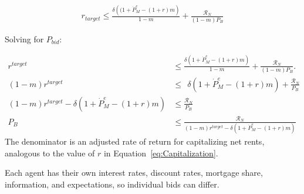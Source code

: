 \begin{eqnarray}
r_{target} \le \frac{\delta \left((1+ \dot P_M^e - (1+r)m\right)}{1-m} + \frac{\mathcal{R}_N}{(1-m)P_B}
\end{eqnarray}

Solving for $P_{bid}$:

\begin{align}
r^{target} &\le \frac{\delta \left(1 + \dot P_M^e - (1+r)m\right)}{1-m}   +\frac{\mathcal{R}_N}{(1-m)P_B}. \nonumber \\
(1-m)r^{target} &\le \ \ \delta \left(1 + \dot P_M^e - (1+r)m\right) + \frac{\mathcal{R}_N}{P_B} \nonumber \\ %
(1-m)r^{target} - \delta \left(1 + \dot P_M^e - (1+r)m\right)  &\le  \frac{\mathcal{R}_N}{P_B} \nonumber\\
P_B & \le    \frac{\mathcal{R}_N}{(1-m)r^{target}-\delta \left(1 + \dot P_M^e - (1+r)m\right)} 
\label{eqn-bid-price1}
\end{align}
The denominator is an adjusted rate of return for capitalizing net rents, analogous to the value of $r$ in Equation~\ref{eq:Capitalization}. 

Each agent has their own interest rates, discount rates, mortgage share, information, and expectations, so individual bids can differ.





